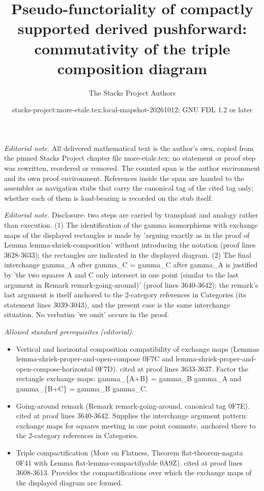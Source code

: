\documentclass{stacks-project}
\title{Pseudo-functoriality of compactly supported derived pushforward: commutativity of the triple composition diagram}
\author{The Stacks Project Authors}
\date{stacks-project:more-etale.tex:local-snapshot-20261012; GNU FDL 1.2 or later}
\theoremstyle{plain}
\theoremstyle{definition}
\theoremstyle{remark}
\numberwithin{equation}{subsection}
\begin{document}
\maketitle
\setcounter{subsection}{1}
\noindent\textit{Editorial note.} All delivered mathematical text is the author's own, copied from the pinned Stacks Project chapter file more-etale.tex; no statement or proof step was rewritten, reordered or removed. The counted span is the author environment and its own proof environment. References inside the span are handed to the assembler as navigation stubs that carry the canonical tag of the cited tag only; whether each of them is load-bearing is recorded on the stub itself.\par\medskip
\noindent\textit{Editorial note.} Disclosure: two steps are carried by transplant and analogy rather than execution. (1) The identification of the gamma isomorphisms with exchange maps of the displayed rectangles is made by 'arguing exactly as in the proof of Lemma lemma-shriek-composition' without introducing the notation (proof lines 3628-3633); the rectangles are indicated in the displayed diagram. (2) The final interchange gamma\_A after gamma\_C = gamma\_C after gamma\_A is justified by 'the two squares A and C only intersect in one point (similar to the last argument in Remark remark-going-around)' (proof lines 3640-3642); the remark's last argument is itself anchored to the 2-category references in Categories (its statement lines 3039-3043), and the present case is the same interchange situation. No verbatim 'we omit' occurs in the proof.\par\medskip
\noindent\textit{Allowed standard prerequisites (editorial).}\begin{itemize}
\item Vertical and horizontal composition compatibility of exchange maps (Lemmas lemma-shriek-proper-and-open-compose 0F7C and lemma-shriek-proper-and-open-compose-horizontal 0F7D). cited at proof lines 3633-3637. Factor the rectangle exchange maps: gamma\_\{A+B\} = gamma\_B gamma\_A and gamma\_\{B+C\} = gamma\_B gamma\_C.
\item Going-around remark (Remark remark-going-around, canonical tag 0F7E). cited at proof lines 3640-3642. Supplies the interchange argument pattern: exchange maps for squares meeting in one point commute, anchored there to the 2-category references in Categories.
\item Triple compactification (More on Flatness, Theorem flat-theorem-nagata 0F41 with Lemma flat-lemma-compactifyable 0A9Z). cited at proof lines 3608-3613. Provides the compactifications over which the exchange maps of the displayed diagram are formed.
\end{itemize}\medskip
\end{document}

